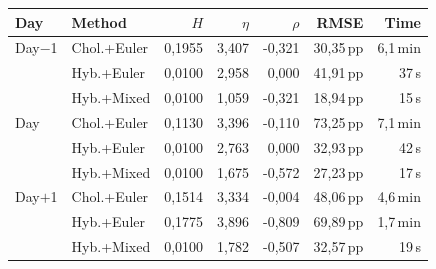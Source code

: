 \begin{tabular}{l l r r r r r}
  \toprule
  \textbf{Day} & \textbf{Method} & \textbf{$H$} & \textbf{$\eta$} & \textbf{$\rho$} & \textbf{RMSE} & \textbf{Time} \\
  \midrule
  Day$-$1 & Chol.+Euler & 0,1955 & 3,407 & -0,321 & 30,35\,pp & 6,1\,min \\
   & Hyb.+Euler & 0,0100 & 2,958 & 0,000 & 41,91\,pp & 37\,s \\
   & Hyb.+Mixed & 0,0100 & 1,059 & -0,321 & 18,94\,pp & 15\,s \\
  \addlinespace[3pt]
  Day & Chol.+Euler & 0,1130 & 3,396 & -0,110 & 73,25\,pp & 7,1\,min \\
   & Hyb.+Euler & 0,0100 & 2,763 & 0,000 & 32,93\,pp & 42\,s \\
   & Hyb.+Mixed & 0,0100 & 1,675 & -0,572 & 27,23\,pp & 17\,s \\
  \addlinespace[3pt]
  Day$+$1 & Chol.+Euler & 0,1514 & 3,334 & -0,004 & 48,06\,pp & 4,6\,min \\
   & Hyb.+Euler & 0,1775 & 3,896 & -0,809 & 69,89\,pp & 1,7\,min \\
   & Hyb.+Mixed & 0,0100 & 1,782 & -0,507 & 32,57\,pp & 19\,s \\
  \bottomrule
\end{tabular}